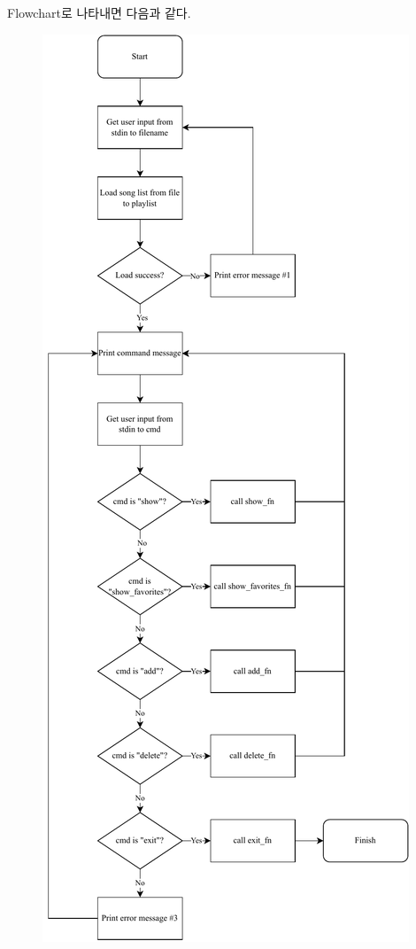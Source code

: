 \documentclass[titlepage]{article}
\begin{document}
Flowchart로 나타내면 다음과 같다.

\begin{figure}[H]
  \centering
  \includegraphics[height=0.8\pdfpageheight]{flowchart.drawio.pdf}
\end{figure}
\end{document}
